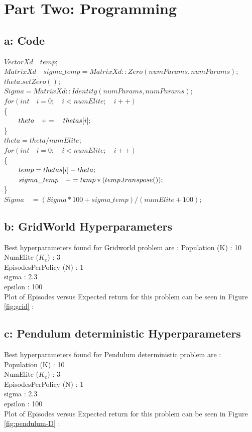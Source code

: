 \documentclass{article}
\begin{document}
\section*{Part Two: Programming}
\subsection*{a: Code } 


$VectorXd  \quad temp;$\\
$MatrixXd  \quad sigma\_temp = MatrixXd::Zero(numParams, numParams);$\\
$theta.setZero();$\\
$Sigma = MatrixXd::Identity(numParams, numParams);$\\
$for (int \quad i = 0 ;\quad i < numElite; \quad i++ )$\\
 \{\\
 $\hspace*{2em} theta  \quad+= \quad thetas[i];$\\
 \}\\
$theta = theta / numElite;$\\
$for (int \quad i = 0 ;\quad i < numElite; \quad i++ )$\\
\{\\
$\hspace*{2em} temp = thetas[i] - theta;$\\
$\hspace*{2em} sigma\_temp \quad+= temp * (temp.transpose());$\\
\}\\
$Sigma \quad= (Sigma*100 + sigma\_temp ) / (numElite + 100);$\\

\subsection*{b: GridWorld Hyperparameters} Best hyperparameters found for Gridworld problem are : 
Population (K) : 10 \\
NumElite ($K_e$) : 3 \\
EpisodesPerPolicy (N) : 1 \\
sigma : 2.3 \\
epsilon : 100 \\
Plot of Episodes versus Expected return for this problem can be seen in Figure \ref{fig:grid} :\\

\subsection*{c: Pendulum deterministic Hyperparameters} Best hyperparameters found for Pendulum deterministic problem are :\\
Population (K) : 10 \\
NumElite ($K_e$) : 3 \\
EpisodesPerPolicy (N) : 1 \\
sigma : 2.3 \\
epsilon : 100 \\
Plot of Episodes versus Expected return for this problem can be seen in Figure \ref{fig:pendulum-D} :\\
\end{document}
